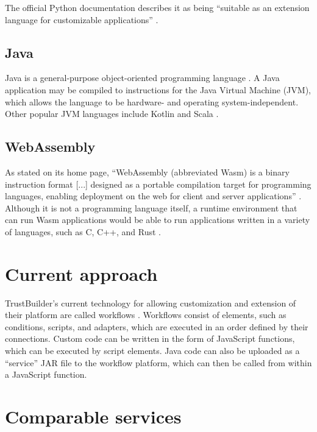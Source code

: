 The official Python documentation describes it as being ``suitable as an extension language for customizable applications'' \autocite{PSF2023}.

\subsection{Java}
Java is a general-purpose object-oriented programming language \autocite{Lindholm2015}. A Java application may be compiled to instructions for the Java Virtual Machine (JVM), which allows the language to be hardware- and operating system-independent. Other popular JVM languages include Kotlin and Scala \autocite{StackOverflow2023, JetBrains2023}.

\subsection{WebAssembly}
As stated on its home page, ``WebAssembly (abbreviated Wasm) is a binary instruction format [...] designed as a portable compilation target for programming languages, enabling deployment on the web for client and server applications'' \autocite{WebAssembly}. Although it is not a programming language itself, a runtime environment that can run Wasm applications would be able to run applications written in a variety of languages, such as C, C++, and Rust \autocite{EmscriptenContributors2015, RWWG2023}.

\section{Current approach}
TrustBuilder's current technology for allowing customization and extension of their platform are called workflows \autocite{DefiningWorkflows}. Workflows consist of elements, such as conditions, scripts, and adapters, which are executed in an order defined by their connections. Custom code can be written in the form of JavaScript functions, which can be executed by script elements. Java code can also be uploaded as a ``service'' JAR file to the workflow platform, which can then be called from within a JavaScript function.

\section{Comparable services}
